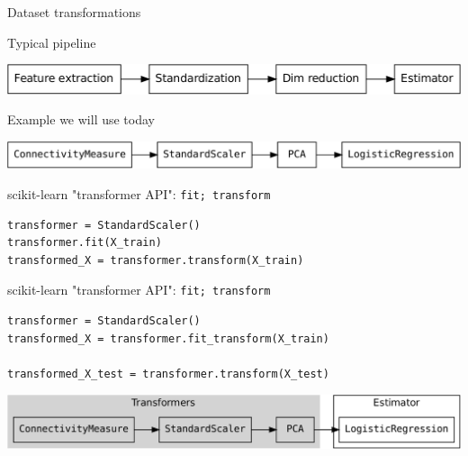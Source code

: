\documentclass[presentation,mathserif,table]{beamer}
\begin{document}
\begin{frame}[label={sec:org6d512ad}]{Dataset transformations}
\begin{block}{Typical pipeline}
\begin{center}
\includegraphics[width=.9\linewidth]{pipeline.pdf}
\end{center}
\end{block}

\begin{block}{Example we will use today}
\begin{center}
\includegraphics[width=.9\linewidth]{pipeline_example.pdf}
\end{center}
\end{block}
\end{frame}
\begin{frame}[label={sec:orga5ef5f2},fragile]{scikit-learn "transformer API": \texttt{fit; transform}}
 \begin{verbatim}
transformer = StandardScaler()
transformer.fit(X_train)
transformed_X = transformer.transform(X_train)
\end{verbatim}
\end{frame}

\begin{frame}[label={sec:orgbc9cffc},fragile]{scikit-learn "transformer API": \texttt{fit; transform}}
 \begin{verbatim}
transformer = StandardScaler()
transformed_X = transformer.fit_transform(X_train)

transformed_X_test = transformer.transform(X_test)
\end{verbatim}
\vfill
\begin{center}
\includegraphics[width=.9\linewidth]{pipeline_transformer_estimator.pdf}
\end{center}
\end{frame}
\end{document}
